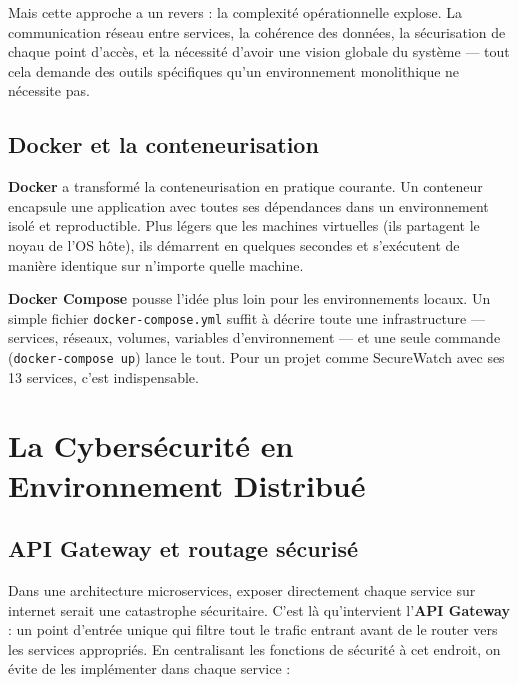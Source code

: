 \documentclass[12pt, a4paper]{report}
\begin{document}
Mais cette approche a un revers : la complexité opérationnelle explose. La communication réseau entre services, la cohérence des données, la sécurisation de chaque point d'accès, et la nécessité d'avoir une vision globale du système — tout cela demande des outils spécifiques qu'un environnement monolithique ne nécessite pas.

\subsection{Docker et la conteneurisation}

\textbf{Docker} a transformé la conteneurisation en pratique courante. Un conteneur encapsule une application avec toutes ses dépendances dans un environnement isolé et reproductible. Plus légers que les machines virtuelles (ils partagent le noyau de l'OS hôte), ils démarrent en quelques secondes et s'exécutent de manière identique sur n'importe quelle machine.

\textbf{Docker Compose} pousse l'idée plus loin pour les environnements locaux. Un simple fichier \texttt{docker-compose.yml} suffit à décrire toute une infrastructure — services, réseaux, volumes, variables d'environnement — et une seule commande (\texttt{docker-compose up}) lance le tout. Pour un projet comme SecureWatch avec ses 13 services, c'est indispensable.

\section{La Cybersécurité en Environnement Distribué}

\subsection{API Gateway et routage sécurisé}

Dans une architecture microservices, exposer directement chaque service sur internet serait une catastrophe sécuritaire. C'est là qu'intervient l'\textbf{API Gateway} : un point d'entrée unique qui filtre tout le trafic entrant avant de le router vers les services appropriés. En centralisant les fonctions de sécurité à cet endroit, on évite de les implémenter dans chaque service :
\end{document}
